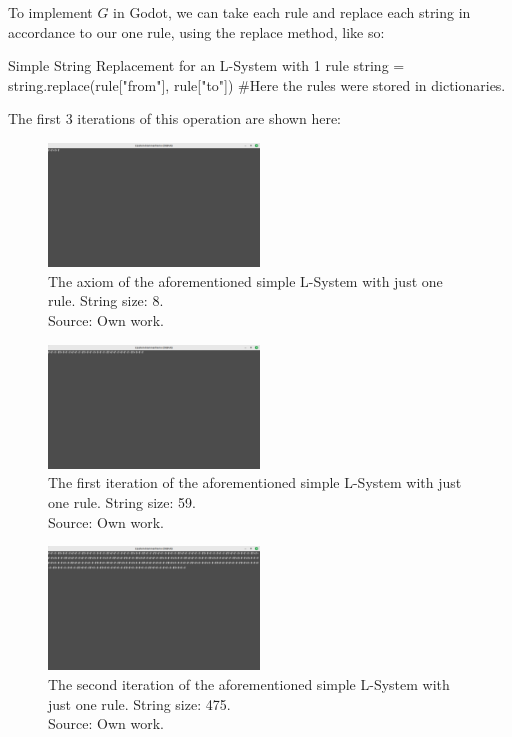 To implement $G$ in Godot, we can take each rule and replace each string in accordance to our one rule, using the replace method, like so:

\begin{codeblock}{Simple String Replacement for an L-System with 1 rule}
string = string.replace(rule["from"], rule["to"]) #Here the rules were stored in dictionaries.
\end{codeblock}

The first 3 iterations of this operation are shown here:

\begin{figure}[H]
	\centering
	\includegraphics[width=0.5\textwidth]{Images/initial-l-system-iteration-0.png}
	\caption{The axiom of the aforementioned simple L-System with just one rule. String size: 8.\\Source: Own work.}
	\label{fig:lsysiter0}
\end{figure}

\begin{figure}[H]
	\centering
	\includegraphics[width=0.5\textwidth]{Images/initial-l-system-iteration-1.png}
	\caption{The first iteration of the aforementioned simple L-System with just one rule. String size: 59.\\Source: Own work.}
	\label{fig:lsysiter1}
\end{figure}

\begin{figure}[H]
	\centering
	\includegraphics[width=0.5\textwidth]{Images/initial-l-system-iteration-2.png}
	\caption{The second iteration of the aforementioned simple L-System with just one rule. String size: 475.\\Source: Own work.}
	\label{fig:lsysiter2}
\end{figure}

